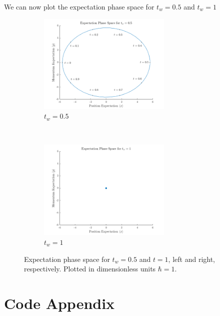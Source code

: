 We can now plot the expectation phase space for $t_w = 0.5$ and $t_w = 1$
\begin{figure}[H]
    \centering
    \begin{subfigure}[t]{0.5\textwidth}
        \centering
        \includegraphics[width=2.5in]{Resources/245/Homework 5/245 Homework 5 Problem 3b.png}
        \caption{$t_w = 0.5$}
        
    \end{subfigure}%
    ~ 
    \begin{subfigure}[t]{0.5\textwidth}
        \centering
        \includegraphics[width=2.5in]{Resources/245/Homework 5/245 Homework 5 Problem 3c.png}
        \caption{$t_w = 1$}
    \end{subfigure}
    \caption{Expectation phase space for $t_w = 0.5$ and $t=1$, left and right, respectively. Plotted in dimensionless units $\hbar = 1$.}
\end{figure}

\newpage
\section*{Code Appendix}
